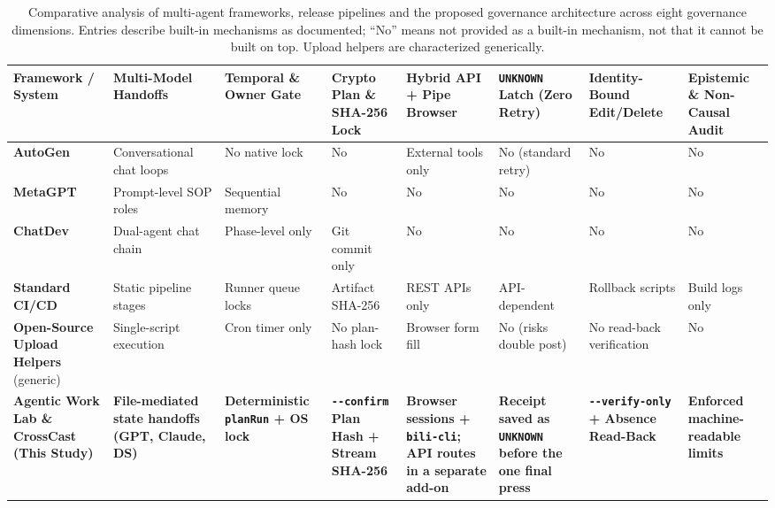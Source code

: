 \documentclass[11pt,a4paper]{article}
\theoremstyle{definition}
\begin{document}
\begin{table}[htbp]
\centering
\caption{Comparative analysis of multi-agent frameworks, release pipelines and the proposed governance architecture across eight governance dimensions. Entries describe built-in mechanisms as documented; ``No'' means not provided as a built-in mechanism, not that it cannot be built on top. Upload helpers are characterized generically.}
\label{tab:1}
\scriptsize
\setlength{\tabcolsep}{2.2pt}
\begin{tabular}{>{\raggedright\hspace{0pt}\arraybackslash}p{}>{\raggedright\hspace{0pt}\arraybackslash}p{}>{\raggedright\hspace{0pt}\arraybackslash}p{}>{\raggedright\hspace{0pt}\arraybackslash}p{}>{\raggedright\hspace{0pt}\arraybackslash}p{}>{\raggedright\hspace{0pt}\arraybackslash}p{}>{\raggedright\hspace{0pt}\arraybackslash}p{}>{\raggedright\hspace{0pt}\arraybackslash}p{}}
\toprule
\textbf{Framework / System} & \textbf{Multi-Model Handoffs} & \textbf{Temporal \& Owner Gate} & \textbf{Crypto Plan \& SHA-256 Lock} & \textbf{Hybrid API + Pipe Browser} & \textbf{\texttt{UNKNOWN} Latch (Zero Retry)} & \textbf{Identity-Bound Edit/Delete} & \textbf{Epistemic \& Non-Causal Audit} \\
\midrule
\textbf{AutoGen} \citep{Wu2023AutoGen} & Conversational chat loops & No native lock & No & External tools only & No (standard retry) & No & No \\
\textbf{MetaGPT} \citep{Hong2023MetaGPT} & Prompt-level SOP roles & Sequential memory & No & No & No & No & No \\
\textbf{ChatDev} \citep{Qian2024ChatDev} & Dual-agent chat chain & Phase-level only & Git commit only & No & No & No & No \\
\textbf{Standard CI/CD} \citep{Humble2010} & Static pipeline stages & Runner queue locks & Artifact SHA-256 & REST APIs only & API-dependent & Rollback scripts & Build logs only \\
\textbf{Open-Source Upload Helpers} (generic) & Single-script execution & Cron timer only & No plan-hash lock & Browser form fill & No (risks double post) & No read-back verification & No \\
\midrule
\textbf{\textbf{Agentic Work Lab \& CrossCast (This Study)}} & \textbf{File-mediated state handoffs (GPT, Claude, DS)} & \textbf{Deterministic \texttt{planRun} + OS lock} & \textbf{\texttt{-{}-confirm} Plan Hash + Stream SHA-256} & \textbf{Browser sessions + \texttt{bili-cli}; API routes in a separate add-on} & \textbf{Receipt saved as \texttt{UNKNOWN} before the one final press} & \textbf{\texttt{-{}-verify-\allowbreak{}only} + Absence Read-Back} & \textbf{Enforced machine-readable limits} \\
\bottomrule
\end{tabular}
\end{table}
\end{document}
